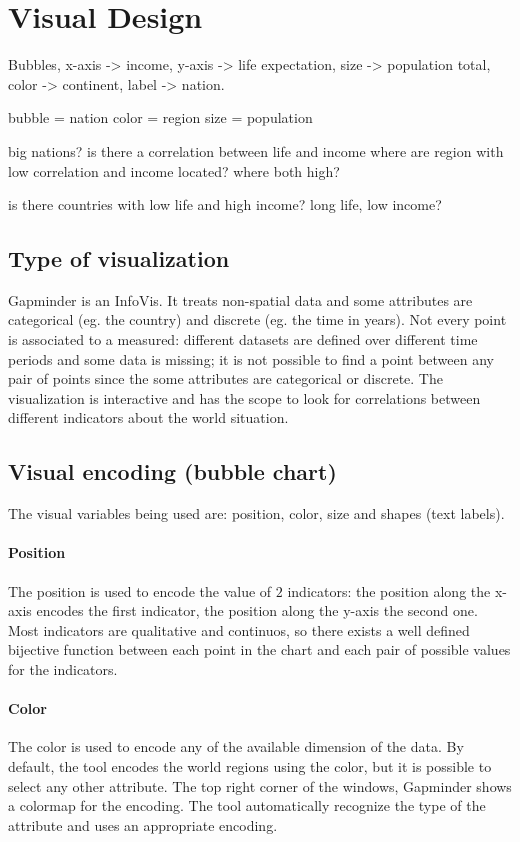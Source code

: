 \section{Visual Design}
\label{sec:visual_design}

Bubbles, x-axis -> income, y-axis -> life expectation, size -> population total, color -> continent, label -> nation.

bubble = nation
color = region
size = population

big nations?
is there a correlation between life and income
where are region with low correlation and income located?
where both high?

is there countries with low life and high income?
long life, low income?

\subsection{Type of visualization}
Gapminder is an InfoVis.
It treats non-spatial data and some attributes are categorical (eg. the country) and discrete (eg. the time in years).
Not every point is associated to a measured: different datasets are defined over different time periods and some data is missing; it is not possible to find a point between any pair of points since the some attributes are categorical or discrete.
The visualization is interactive and has the scope to look for correlations between different indicators about the world situation.

\subsection{Visual encoding (bubble chart)}
The visual variables being used are: position, color, size and shapes (text labels).

\paragraph{Position}
The position is used to encode the value of $2$ indicators: the position along the x-axis encodes the first indicator, the position along the y-axis the second one.
Most indicators are qualitative and continuos, so there exists a well defined bijective function between each point in the chart and each pair of possible values for the indicators.


\paragraph{Color}
The color is used to encode any of the available dimension of the data.
By default, the tool encodes the world regions using the color, but it is possible to select any other attribute.
The top right corner of the windows, Gapminder shows a colormap for the encoding.
The tool automatically recognize the type of the attribute and uses an appropriate encoding.

